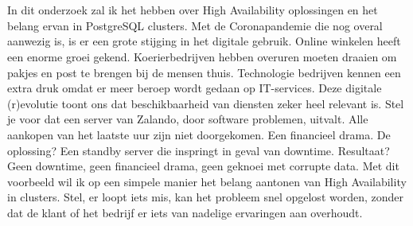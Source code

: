 \chapter{}
\label{ch:inleiding}



\section{}
\label{sec:probleemstelling}

In dit onderzoek zal ik het hebben over High Availability oplossingen en het belang ervan in PostgreSQL clusters. Met de Coronapandemie die nog overal aanwezig is, is er een grote stijging in het digitale gebruik. Online winkelen heeft een enorme groei gekend. Koerierbedrijven hebben overuren moeten draaien om pakjes en post te brengen bij de mensen thuis. Technologie bedrijven kennen een extra druk omdat er meer beroep wordt gedaan op IT-services. Deze digitale (r)evolutie toont ons dat beschikbaarheid van diensten zeker heel relevant is. Stel je voor dat een server van Zalando, door software problemen, uitvalt. Alle aankopen van het laatste uur zijn niet doorgekomen. Een financieel drama. De oplossing? Een standby server die inspringt in geval van downtime. Resultaat? Geen downtime, geen financieel drama, geen geknoei met corrupte data. Met dit voorbeeld wil ik op een simpele manier het belang aantonen van High Availability in clusters. Stel, er loopt iets mis, kan het probleem snel opgelost worden, zonder dat de klant of het bedrijf er iets van nadelige ervaringen aan overhoudt.

